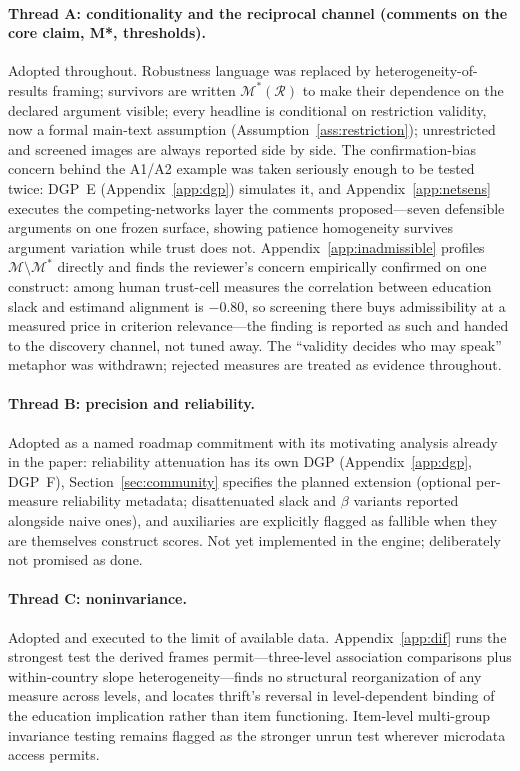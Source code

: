 \documentclass[10pt,letterpaper]{article}
\newcommand{\M}{\ensuremath{\mathcal{M}}}
\newcommand{\Rset}{\mathcal{R}}
\begin{document}
\paragraph{Thread A: conditionality and the reciprocal channel (comments on the core claim, M*, thresholds).}
Adopted throughout.
Robustness language was replaced by heterogeneity-of-results framing; survivors are written $\M^*(\Rset)$ to make their dependence on the declared argument visible; every headline is conditional on restriction validity, now a formal main-text assumption (Assumption~\ref{ass:restriction}); unrestricted and screened images are always reported side by side.
The confirmation-bias concern behind the A1/A2 example was taken seriously enough to be tested twice: DGP~E (Appendix~\ref{app:dgp}) simulates it, and Appendix~\ref{app:netsens} executes the competing-networks layer the comments proposed---seven defensible arguments on one frozen surface, showing patience homogeneity survives argument variation while trust does not.
Appendix~\ref{app:inadmissible} profiles $\M\setminus\M^*$ directly and finds the reviewer's concern empirically confirmed on one construct: among human trust-cell measures the correlation between education slack and estimand alignment is $-0.80$, so screening there buys admissibility at a measured price in criterion relevance---the finding is reported as such and handed to the discovery channel, not tuned away.
The ``validity decides who may speak'' metaphor was withdrawn; rejected measures are treated as evidence throughout.

\paragraph{Thread B: precision and reliability.}
Adopted as a named roadmap commitment with its motivating analysis already in the paper: reliability attenuation has its own DGP (Appendix~\ref{app:dgp}, DGP~F), Section~\ref{sec:community} specifies the planned extension (optional per-measure reliability metadata; disattenuated slack and $\beta$ variants reported alongside naive ones), and auxiliaries are explicitly flagged as fallible when they are themselves construct scores.
Not yet implemented in the engine; deliberately not promised as done.

\paragraph{Thread C: noninvariance.}
Adopted and executed to the limit of available data.
Appendix~\ref{app:dif} runs the strongest test the derived frames permit---three-level association comparisons plus within-country slope heterogeneity---finds no structural reorganization of any measure across levels, and locates thrift's reversal in level-dependent binding of the education implication rather than item functioning.
Item-level multi-group invariance testing remains flagged as the stronger unrun test wherever microdata access permits.
\end{document}
